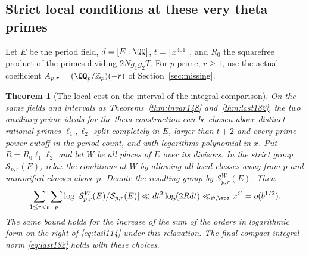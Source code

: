 \documentclass[a4paper,11pt]{article}
\newtheorem{theorem}[proposition]{Theorem}
\theoremstyle{definition}
\theoremstyle{remark}
\newcommand{\ZZ}{\mathbb Z}\newcommand{\ord}{\operatorname{ord}}
\numberwithin{equation}{section}
\begin{document}
\subsection{Strict local conditions at these very theta primes}\label{nav:II-35}
Let \(E\) be the period field, \(d=[E:\QQ]\),
\(t=\lfloor x^{401}\rfloor\), and \(R_0\) the squarefree
product of the primes dividing \(2Ng_1g_2T\). For
\(p\) prime, \(r\ge1\), use the actual coefficient
\(A_{p,r}=(\QQ_p/\ZZ_p)(-r)\) of Section~\ref{sec:missing}.

\begin{theorem}[The local cost on the interval of the integral comparison]
\label{thm:both184}
On the same fields and intervals as Theorems~\ref{thm:invar148}
and~\ref{thm:last182}, the two auxiliary prime ideals for
the theta construction can be chosen above distinct rational
primes \(\ell_1,\ell_2\) split completely in \(E\), larger
than \(t+2\) and every prime-power cutoff in the period
count, and with logarithms polynomial in \(x\).
Put \(R=R_0\ell_1\ell_2\) and let \(W\) be all places of
\(E\) over its divisors. In the strict group \(\mathcal
S_{p,r}(E)\), relax the conditions at \(W\) by allowing
all local classes away from \(p\) and unramified classes
above \(p\). Denote the resulting group by
\(\mathcal S^W_{p,r}(E)\). Then
\begin{equation}
  \sum_{1\le r<t}\sum_p
   \log|\mathcal S^W_{p,r}(E)/\mathcal S_{p,r}(E)|
        \ll d t^2\log(2Rdt)\ll_{\psi,\eps} x^C=o(b^{1/2}).
                                                         \label{eq:both184}
\end{equation}
The same bound holds for the increase of the sum of the
orders in logarithmic form on the right of \eqref{eq:tail114}
under this relaxation. The final compact integral norm
\eqref{eq:last182} holds with these choices.
\end{theorem}
\end{document}
